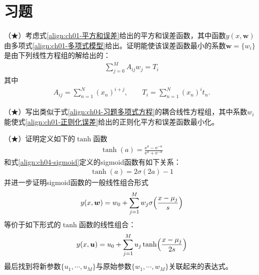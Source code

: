 \documentclass[../../main.tex]{subfiles}
\begin{document}
\section{习题}\label{section:ch04-习题}

\begin{exercise}\label{exercise:ch04-01}
（★）考虑式\eqref{align:ch01-平方和误差}给出的平方和误差函数，其中函数$y(x,\boldsymbol{w})$由多项式\eqref{align:ch01-多项式模型}给出。证明能使该误差函数最小的系数$\boldsymbol{w}=\{w_i\}$是由下列线性方程组的解给出的：
\begin{align}
  \sum_{j=0}^{M}A_{ij}w_j=T_i
  \label{align:ch04-习题多项式方程}
\end{align}
其中
\begin{align}
  A_{ij}=\sum_{n=1}^{N}(x_n)^{i+j},\qquad T_i=\sum_{n=1}^{N}(x_n)^{i}t_n.
  \label{align:ch04-习题多项式系数}
\end{align}
\end{exercise}

\begin{exercise}\label{exercise:ch04-02}
（★）写出类似于式\eqref{align:ch04-习题多项式方程}的耦合线性方程组，其中系数$w_i$能使式\eqref{align:ch01-正则化误差}给出的正则化平方和误差函数最小化。
\end{exercise}

\begin{exercise}\label{exercise:ch04-03}
（★）证明定义如下的$\tanh$函数
\begin{align}
  \tanh(a)=\frac{\mathrm{e}^{a}-\mathrm{e}^{-a}}{\mathrm{e}^{a}+\mathrm{e}^{-a}}
  \label{align:ch04-习题tanh定义}
\end{align}
和式\eqref{align:ch04-sigmoid}定义的sigmoid函数有如下关系：
\begin{align}
  \tanh(a)=2\sigma(2a)-1
  \label{align:ch04-习题tanh关系}
\end{align}
并进一步证明sigmoid函数的一般线性组合形式
\begin{align}
  y(x,\boldsymbol{w})=w_0+\sum_{j=1}^{M}w_j\sigma\Bigl(\frac{x-\mu_j}{s}\Bigr)
  \label{align:ch04-习题sigmoid组合}
\end{align}
等价于如下形式的$\tanh$函数的线性组合：
\begin{align}
  y(x,\boldsymbol{u})=u_0+\sum_{j=1}^{M}u_j\tanh\Bigl(\frac{x-\mu_j}{2s}\Bigr)
  \label{align:ch04-习题tanh组合}
\end{align}
最后找到将新参数$\{u_1,\cdots,u_M\}$与原始参数$\{w_1,\cdots,w_M\}$关联起来的表达式。
\end{exercise}
\end{document}
